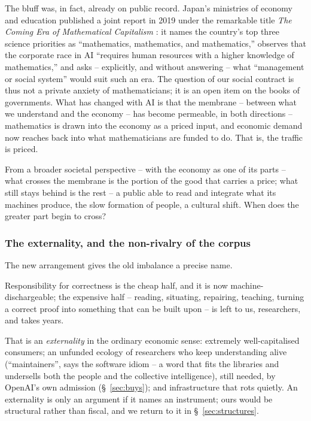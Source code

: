 \documentclass[11pt, a4paper,twosided]{amsart}
\newcommand{\key}[1]{\emph{#1}}
\begin{document}
The bluff was, in fact, already on public record. Japan's ministries of economy and education published a joint report in 2019 under the remarkable title \emph{The Coming Era of Mathematical Capitalism} \cite{meti2019}: it names the country's top three science priorities as ``mathematics, mathematics, and mathematics,'' observes that the corporate race in AI ``requires human resources with a higher knowledge of mathematics,'' and asks -- explicitly, and without answering -- what ``management or social system'' would suit such an era. The question of our social contract is thus not a private anxiety of mathematicians; it is an open item on the books of governments. What has changed with AI is that the membrane -- between what we understand and the economy -- has become permeable, in both directions -- mathematics is drawn into the economy as a priced input, and economic demand now reaches back into what mathematicians are funded to do. That is, the traffic is priced.


 From a broader societal perspective -- with the economy as one of its parts -- what crosses the membrane is the portion of the good that carries a price; what still stays behind is the rest -- a public able to read and integrate what its machines produce, the slow formation of people, a cultural shift. When does the greater part begin to cross?


\subsubsection{The externality, and the non-rivalry of the corpus}\label{sub:extRiv}

  The new arrangement gives the old imbalance a precise name.


\begin{pullquote}
  Responsibility for correctness is the cheap half, and it is now machine-dischargeable; the expensive half -- reading, situating, repairing, teaching, turning a correct proof into something that can be built upon -- is left to us, researchers, and takes years.
\end{pullquote}


That is an \key{externality} in the ordinary economic sense: extremely well-capitalised consumers; an unfunded ecology of researchers who keep understanding alive (``maintainers'', says the software idiom -- a word that fits the libraries and undersells both the people and the collective intelligence), still needed, by OpenAI's own admission (\S~\ref{sec:buys}); and infrastructure that rots quietly. An externality is only an argument if it names an instrument; ours would be structural rather than fiscal, and we return to it in \S~\ref{sec:structures}.
\end{document}
